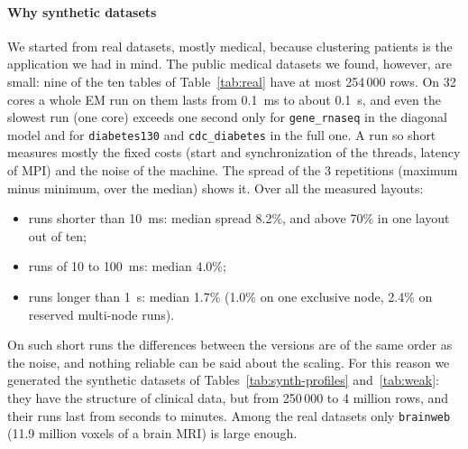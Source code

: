 \documentclass[conference,onecolumn]{IEEEtran}
\begin{document}
\paragraph{Why synthetic datasets} We started from real datasets, mostly medical, because clustering patients is the application we had in mind. The public medical datasets we found, however, are small: nine of the ten tables of Table~\ref{tab:real} have at most 254\,000 rows. On 32 cores a whole EM run on them lasts from 0.1~ms to about 0.1~s, and even the slowest run (one core) exceeds one second only for \texttt{gene\_rnaseq} in the diagonal model and for \texttt{diabetes130} and \texttt{cdc\_diabetes} in the full one. A run so short measures mostly the fixed costs (start and synchronization of the threads, latency of MPI) and the noise of the machine. The spread of the 3 repetitions (maximum minus minimum, over the median) shows it. Over all the measured layouts:
\begin{itemize}
\item runs shorter than 10~ms: median spread 8.2\%, and above 70\% in one layout out of ten;
\item runs of 10 to 100~ms: median 4.0\%;
\item runs longer than 1~s: median 1.7\% (1.0\% on one exclusive node, 2.4\% on reserved multi-node runs).
\end{itemize}
On such short runs the differences between the versions are of the same order as the noise, and nothing reliable can be said about the scaling. For this reason we generated the synthetic datasets of Tables~\ref{tab:synth-profiles} and~\ref{tab:weak}: they have the structure of clinical data, but from 250\,000 to 4 million rows, and their runs last from seconds to minutes. Among the real datasets only \texttt{brainweb} (11.9 million voxels of a brain MRI) is large enough.
\end{document}
